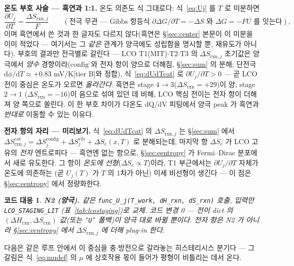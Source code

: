 \documentclass[11pt,a4paper]{article}
\newtheorem*{codebox}{코드 대응}
\newcommand{\dd}{\mathrm{d}}
\newcommand{\rxn}{\mathrm{rxn}}
\newcommand{\cat}{\mathrm{cat}}
\newcommand{\config}{\mathrm{config}}
\newcommand{\vib}{\mathrm{vib}}
\newcommand{\code}[1]{\texttt{#1}}
\begin{document}
\textbf{온도 부호 사슬 — 흑연과 1:1.} 온도 의존도 식 그대로다: 식~\eqref{eq:Uj} 를 $T$ 로 미분하면
\begin{equation}
\frac{\partial U_j}{\partial T}=\frac{\Delta S_{\rxn,j}}{F}
\qquad(\text{전극 무관 — Gibbs 항등식 }\partial\Delta G/\partial T=-\Delta S\text{ 와 }\Delta G=-FU\text{ 를 잇는다}),
\label{eq:dUdTcat}
\end{equation}
이며 흑연에서 쓴 것과 한 글자도 다르지 않다(흑연은 \S\ref{sec:center} 본문이 이 미분을 이미 적었다 — 여기서는 그 \emph{같은}
관계가 양극에도 성립함을 명시할 뿐, 재유도가 아니다). 부호의 결과만 전극별로 갈린다 — LCO T1(MIT)$\cdot$T2$\cdot$T3 의
$\Delta S_{\rxn,j}$ 초기값은 양극에서 \emph{양수} 경향이라($\config$ 와 전자 항이 양으로 더해짐, \S\ref{sec:sum} 의 분해;
단전극 $\dd\phi/\dd T\approx+0.83$ mV/K[tier B]와 정합), 식~\eqref{eq:dUdTcat} 로 $\partial U_j/\partial T>0$ — 곧 LCO
전이 중심은 온도가 오르면 \emph{올라간다}. 흑연은 stage $4\!\to\!3$($\Delta S_\rxn=+29$)이 양, stage $2\!\to\!1$
($\Delta S_\rxn=-16$)이 음으로 섞여 있던 데 비해, LCO 핵심 전이는 전자 항이 더해져 양 쪽으로 쏠린다. 이 한 부호 차이가
다온도 dQ/dV 피팅에서 양극 peak 가 흑연과 \emph{반대로} 이동할 수 있는 이유다.

\textbf{전자 항의 자리 — 미리보기.} 식~\eqref{eq:dUdTcat} 의 $\Delta S_{\rxn,j}$ 는 \S\ref{sec:sum} 에서
$\Delta S_{\rxn,j}^\cat=\Delta S^\config_j+\Delta S^\vib_j+\Delta S_e(x,T)$ 로 분해되는데, 마지막 항 $\Delta S_e$ 가
LCO 고유의 \emph{전자} 엔트로피다 — 흑연엔 없는 항으로, \S\ref{sec:eentropy} 가 Fermi--Dirac 분포에서 새로 유도한다.
그 항이 \emph{온도에 선형}($\Delta S_e\propto T$)이라, T1 부근에서는 $\partial U_j/\partial T$ 자체가 온도에 의존하는
(곧 $U_j(T)$ 가 $T$ 의 1차가 아닌) 미세 비선형이 생긴다 — 이 점은 \S\ref{sec:eentropy} 에서 정량화한다.

\begin{codebox}
\textbf{N2 (양극).} 같은 \code{func\_U\_j(T\_work, dH\_rxn, dS\_rxn)} 호출, 입력만 \code{LCO\_STAGING\_LIT}
(표~\ref{tab:lcostaging})로 교체. 코드 변경 0 — 전이 dict 의 $(\Delta H_\rxn,\Delta S_\rxn)$ 값(또는 \code{'U'} 폴백)이
양극 대로 바뀔 뿐이다. 전자 항은 N2 가 아니라 \S\ref{sec:eentropy} 에서 $\Delta S_{\rxn,j}$ 에 더해 plug-in 한다.
\end{codebox}

다음은 같은 루프 안에서 이 중심을 충$\cdot$방전으로 갈라놓는 히스테리시스 분기다 — 그 갈림은 식~\eqref{eq:mudef} 의
$\mu$ 에 상호작용 몫이 들어가 평형이 비틀리는 데서 온다.

\end{document}
